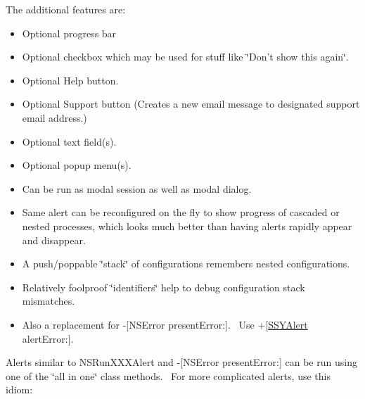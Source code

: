 The additional features are: \begin{itemize}
\item Optional progress bar \item Optional checkbox which may be used for stuff like \char`\"{}Don't show this again\char`\"{}. \item Optional Help button. \item Optional Support button (Creates a new email message to designated support email address.) \item Optional text field(s). \item Optional popup menu(s). \item Can be run as modal session as well as modal dialog. \item Same alert can be reconfigured on the fly to show progress of cascaded or nested processes, which looks much better than having alerts rapidly appear and disappear. \item A push/poppable \char`\"{}stack\char`\"{} of configurations remembers nested configurations. \item Relatively foolproof \char`\"{}identifiers\char`\"{} help to debug configuration stack mismatches. \item Also a replacement for -\mbox{[}NSError presentError:\mbox{]}.~ Use +\mbox{[}\hyperlink{interface_s_s_y_alert}{SSYAlert} alertError:\mbox{]}. \end{itemize}


Alerts similar to NSRunXXXAlert and -\mbox{[}NSError presentError:\mbox{]} can be run using one of the \char`\"{}all in one\char`\"{} class methods.~ For more complicated alerts, use this idiom:  

